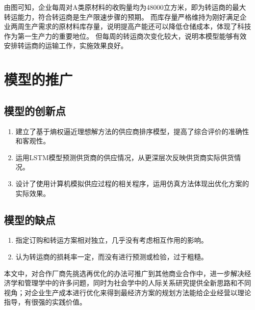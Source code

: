 由图可知，企业每周对A类原材料的收购量均为48000立方米，即为转运商的最大转运能力，符合转运商是生产限速步骤的预期。
而库存量严格维持为刚好满足企业两周生产需求的原材料库存量，说明提高产能还可以降低仓储成本，体现了科技作为第一生产力的重要地位。
但每周的转运商次变化较大，说明本模型能够有效安排转运商的运输工作，实施效果良好。

\section{模型的推广}

\subsection{模型的创新点}
\begin{enumerate}
\item 建立了基于熵权逼近理想解方法的供应商排序模型，提高了综合评价的准确性和客观性。
\item 运用LSTM模型预测供货商的供应情况，从更深层次反映供货商实际供货情况。
\item 设计了使用计算机模拟供应过程的相关程序，运用仿真方法体现出优化方案的实际效果。
\end{enumerate}

\subsection{模型的缺点}
\begin{enumerate}
\item 指定订购和转运方案相对独立，几乎没有考虑相互作用的影响。
\item 认为转运商的损耗率一定，而没有进行预测或检验，过于粗糙。
\end{enumerate}

本文中，对合作厂商先挑选再优化的办法可推广到其他商业合作中，进一步解决经济学和管理学中的许多问题，同时为社会学中的人际关系研究提供全新思路和不同视角；对企业生产成本进行优化来得到最经济方案的规划方法能给企业经营以理论指导，有很强的实践价值。
